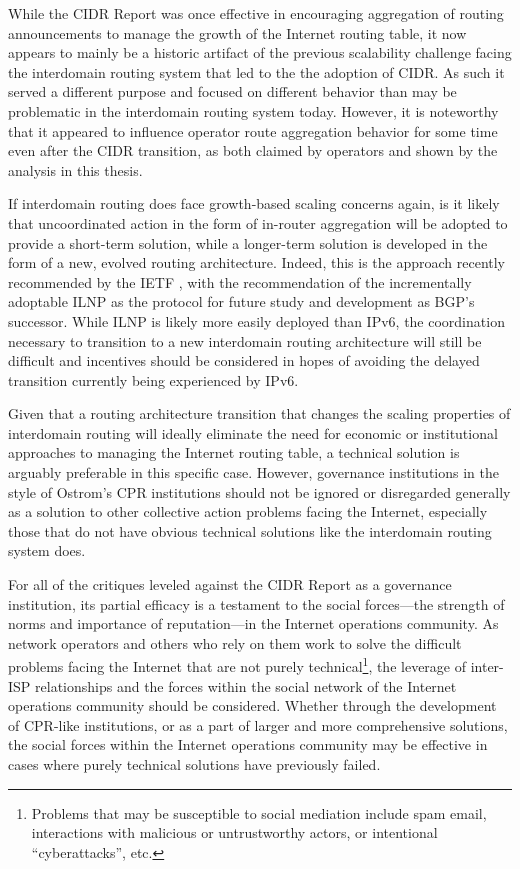 While the CIDR Report was once effective in encouraging aggregation of routing
announcements to manage the growth of the Internet routing table, it now
appears to mainly be a historic artifact of the previous scalability challenge
facing the interdomain routing system that led to the the adoption of CIDR. As
such it served a different purpose and focused on different behavior than may
be problematic in the interdomain routing system today. However, it is
noteworthy that it appeared to influence operator route aggregation behavior
for some time even after the CIDR transition, as both claimed by operators and
shown by the analysis in this thesis.

If interdomain routing does face growth-based scaling concerns again, is it
likely that uncoordinated action in the form of in-router aggregation will be
adopted to provide a short-term solution, while a longer-term solution is
developed in the form of a new, evolved routing architecture. Indeed, this is
the approach recently recommended by the IETF \cite{rfc6115}, with the
recommendation of the incrementally adoptable ILNP as the protocol for future
study and development as BGP's successor. While ILNP is likely more easily
deployed than IPv6, the coordination necessary to transition to a new
interdomain routing architecture will still be difficult and incentives should
be considered in hopes of avoiding the delayed transition currently being
experienced by IPv6.

Given that a routing architecture transition that changes the scaling
properties of interdomain routing will ideally eliminate the need for economic
or institutional approaches to managing the Internet routing table, a technical
solution is arguably preferable in this specific case.  However, governance
institutions in the style of Ostrom's CPR institutions should not be ignored or
disregarded generally as a solution to other collective action problems facing
the Internet, especially those that do not have obvious technical solutions
like the interdomain routing system does.

For all of the critiques leveled against the CIDR Report as a governance
institution, its partial efficacy is a testament to the social forces---the
strength of norms and importance of reputation---in the Internet operations
community. As network operators and others who rely on them work to solve the
difficult problems facing the Internet that are not purely
technical\footnote{Problems that may be susceptible to social mediation include
spam email, interactions with malicious or untrustworthy actors, or intentional
``cyberattacks'', etc.}, the leverage of inter-ISP relationships and the forces
within the social network of the Internet operations community should be
considered. Whether through the development of CPR-like institutions, or as a
part of larger and more comprehensive solutions, the social forces within the
Internet operations community may be effective in cases where purely technical
solutions have previously failed.

